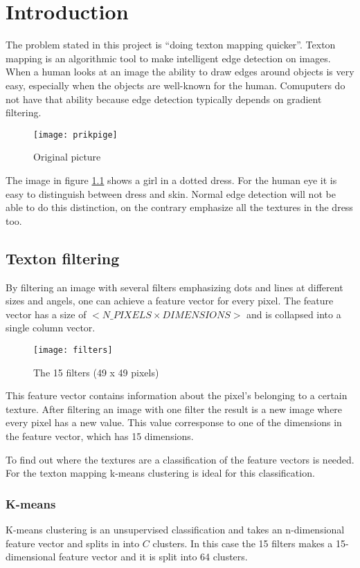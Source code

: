 \chapter{Introduction}
The problem stated in this project is ``doing texton mapping quicker''.
Texton mapping is an algorithmic tool to make intelligent edge detection on images. 
When a human looks at an image the ability to draw edges around objects is very easy, 
especially when the objects are well-known for the human. 
Comuputers do not have that ability because edge detection typically depends on gradient filtering.

\begin{figure}[H]
\centering
\texttt{[image: prikpige]}
\caption{Original picture}
\label{fig:prikpige}
\end{figure}

The image in figure \ref{fig:prikpige} shows a girl in a dotted dress. 
For the human eye it is easy to distinguish between dress and skin. 
Normal edge detection will not be able to do this distinction, 
on the contrary emphasize all the textures in the dress too.

\section{Texton filtering}
By filtering an image with several filters emphasizing dots and lines at different sizes and angels, 
one can achieve a feature vector for every pixel. 
The feature vector has a size of $<N\_PIXELS\times DIMENSIONS>$ and is collapsed into a single column vector. 

\begin{figure}[H]
\centering
\texttt{[image: filters]}
\caption{The 15 filters (49 x 49 pixels)}
\label{fig:filtre}
\end{figure}


This feature vector contains information about the pixel's belonging to a certain texture. 
After filtering an image with one filter the result is a new image where every pixel has a new value. 
This value corresponse to one of the dimensions in the feature vector, which has 15 dimensions.

To find out where the textures are a classification of the feature vectors is needed. 
For the texton mapping k-means clustering is ideal for this classification.


\subsection{K-means}
K-means clustering is an unsupervised classification and takes an n-dimensional feature vector and splits in into $C$ clusters. 
In this case the 15 filters makes a 15-dimensional feature vector and it is split into 64 clusters. 

